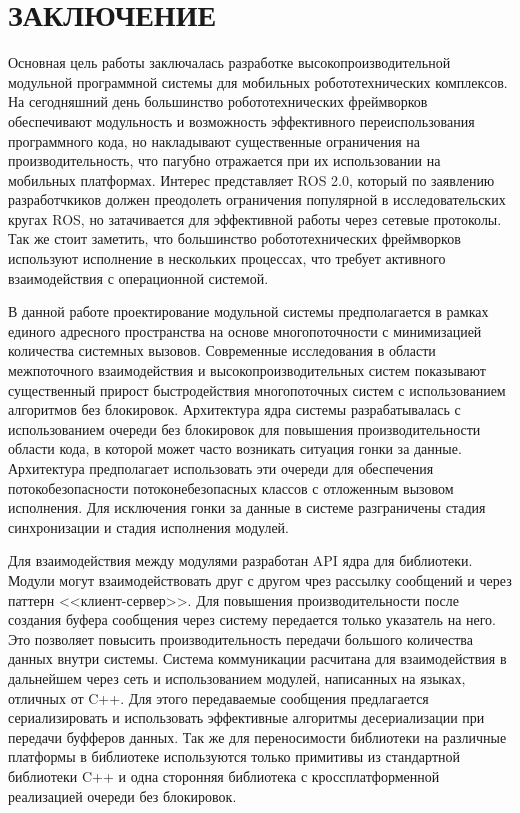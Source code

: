 \chapter*{ЗАКЛЮЧЕНИЕ}

Основная цель работы заключалась разработке 
высокопроизводительной модульной программной системы для 
мобильных робототехнических комплексов. На сегодняшний день 
большинство робототехнических фреймворков обеспечивают 
модульность и возможность эффективного переиспользования 
программного кода, но накладывают существенные ограничения на 
производительность, что пагубно отражается при их использовании 
на мобильных платформах. Интерес представляет ROS 2.0, который 
по заявлению разработчкиков должен преодолеть ограничения 
популярной в исследовательских кругах ROS, но затачивается для 
эффективной работы через сетевые протоколы. Так же стоит 
заметить, что большинство робототехнических фреймворков 
используют исполнение в нескольких процессах, что требует 
активного взаимодействия с операционной системой.

В данной работе проектирование модульной системы предполагается 
в рамках единого адресного пространства на основе 
многопоточности с минимизацией количества системных вызовов. 
Современные исследования в области межпоточного взаимодействия и 
высокопроизводительных систем показывают существенный прирост 
быстродействия многопоточных систем с использованием алгоритмов 
без блокировок. Архитектура ядра системы разрабатывалась с 
использованием очереди без блокировок для повышения 
производительности области кода, в которой может часто возникать 
ситуация гонки за данные. Архитектура предполагает использовать 
эти очереди для обеспечения потокобезопасности 
потоконебезопасных классов с отложенным вызовом исполнения. Для 
исключения гонки за данные в системе разграничены стадия 
синхронизации и стадия исполнения модулей.

Для взаимодействия между модулями разработан API ядра для 
библиотеки. Модули могут взаимодействовать друг с другом чрез 
рассылку сообщений и через паттерн <<клиент-сервер>>. Для 
повышения производительности после создания буфера сообщения 
через систему передается только указатель на него. Это позволяет 
повысить производительность передачи большого количества данных 
внутри системы. Система коммуникации расчитана для 
взаимодействия в дальнейшем через сеть и использованием модулей, 
написанных на языках, отличных от C++. Для этого передаваемые 
сообщения предлагается сериализировать и использовать 
эффективные алгоритмы десериализации при передачи буфферов 
данных. Так же для переносимости библиотеки на различные 
платформы в библиотеке используются только примитивы из 
стандартной библиотеки C++ и одна сторонняя библиотека с 
кроссплатформенной реализацией очереди без блокировок.


